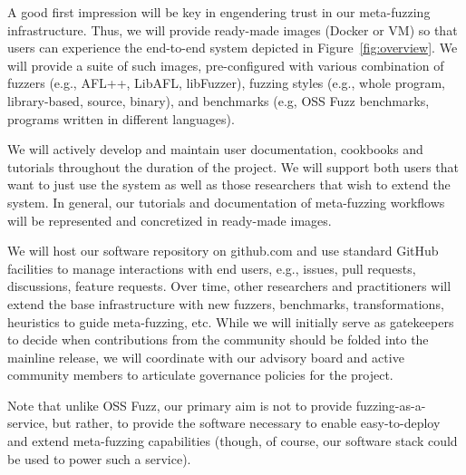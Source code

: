 

A good first impression will be key in engendering trust in our meta-fuzzing infrastructure.
Thus, we will provide ready-made images (Docker or VM) so that users can experience
the end-to-end system depicted in Figure~\ref{fig:overview}.
We will provide a suite of such images, pre-configured with various combination of
fuzzers (e.g., AFL++, LibAFL, libFuzzer), 
fuzzing styles (e.g., whole program, library-based, source, binary), 
and benchmarks (e.g, OSS Fuzz benchmarks, programs written in different languages).

We will actively develop and maintain user documentation, cookbooks and tutorials throughout
the duration of the project. We will support both users that want to just use the system
as well as those researchers that wish to extend the system.
In general, our tutorials and documentation of meta-fuzzing workflows will be
represented and concretized in ready-made images. 

We will host our software repository on github.com and use standard GitHub facilities
to manage interactions with end users, e.g., issues, pull requests, discussions, feature requests.
Over time, other researchers and practitioners will extend the base infrastructure with
new fuzzers, benchmarks, transformations, heuristics to guide meta-fuzzing, etc. 
While we will initially serve as gatekeepers to decide when contributions from the community
should be folded into the mainline release, we will coordinate with our advisory board and active community 
members to articulate governance policies for the project.

Note that unlike OSS Fuzz, our primary aim is not to provide fuzzing-as-a-service, but
rather, to provide the software necessary to enable easy-to-deploy and extend meta-fuzzing 
capabilities (though, of course, our software stack could be used to power such a service).

